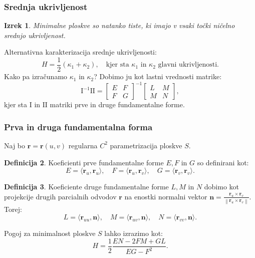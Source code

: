 \documentclass[10pt]{beamer}
\theoremstyle{definition}
\newtheorem{definicija}{Definicija}
\theoremstyle{remark}
\theoremstyle{plain}
\newtheorem{izrek}[definicija]{Izrek}
\numberwithin{equation}{section}  %
\begin{document}
\begin{frame}
    \frametitle{Srednja ukrivljenost}

    \begin{izrek}
        Minimalne ploskve so natanko tiste, ki imajo v vsaki točki ničelno srednjo ukrivljenost. 
    \end{izrek}

    Alternativna karakterizacija srednje ukrivljenosti:
    $$
    H=\frac{1}{2}\left(\kappa_1+\kappa_2\right), \quad \text{kjer sta } \kappa_1 \text{ in } \kappa_2 \text{ glavni ukrivljenosti.} 
    $$
    Kako pa izračunamo $\kappa_1$ in $\kappa_2$? Dobimo ju kot lastni vrednosti matrike: 
    $$
    \mathrm{I}^{-1} \mathrm{II}=\begin{bmatrix} E & F \\ F & G \end{bmatrix}^{-1} \begin{bmatrix} L & M \\ M & N \end{bmatrix},
    $$
    kjer sta $\mathrm{I}$ in $\mathrm{II}$ matriki prve in druge fundamentalne forme.

\end{frame}

\begin{frame}
    \frametitle{Prva in druga fundamentalna forma}

    Naj bo $\mathbf{r}=\mathbf{r}(u, v)$ regularna $C^2$ parametrizacija ploskve $S$. 

    \begin{definicija}
        Koeficienti prve fundamentalne forme $E, F$ in $G$ so definirani kot: 
        $$
        E=\langle\mathbf{r}_u, \mathbf{r}_u\rangle, \quad F=\langle\mathbf{r}_u, \mathbf{r}_v\rangle, \quad G=\langle\mathbf{r}_v, \mathbf{r}_v\rangle.
        $$
    \end{definicija}

    \begin{definicija}
        Koeficiente druge fundamentalne forme $L, M$ in $N$ dobimo kot projekcije drugih parcialnih odvodov $\mathbf{r}$ na enostki normalni vektor $\mathbf{n}=\frac{\mathbf{r}_u \times \mathbf{r}_v}{\left\|\mathbf{r}_u \times \mathbf{r}_v\right\|}$. Torej: 
        $$
        L=\langle \mathbf{r}_{u u}, \mathbf{n} \rangle, \quad M=\langle \mathbf{r}_{u v}, \mathbf{n}\rangle, \quad N= \langle \mathbf{r}_{v v}, \mathbf{n} \rangle.
        $$
    \end{definicija}

    Pogoj za minimalnost ploskve $S$ lahko izrazimo kot: 
    $$
    H=\frac{1}{2} \frac{E N-2 F M+G L}{E G-F^2}.
    $$

\end{frame}
\end{document}

